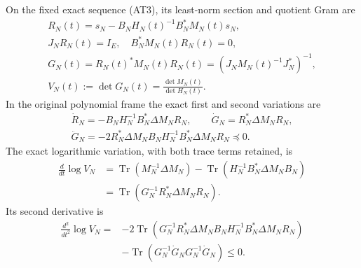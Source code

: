 \documentclass{article}
\newcommand{\Tr}{\operatorname{Tr}}
\begin{document}
\begin{theorem}
On the fixed exact sequence (AT3), its least-norm section and quotient
Gram are
\[
 \begin{gathered}
 R_N(t)=s_N-B_NH_N(t)^{-1}B_N^*M_N(t)s_N,\\
 J_NR_N(t)=I_E,\quad B_N^*M_N(t)R_N(t)=0,\\
 G_N(t)=R_N(t)^*M_N(t)R_N(t)
       =(J_NM_N(t)^{-1}J_N^*)^{-1},\\
 V_N(t):=\det G_N(t)=\frac{\det M_N(t)}{\det H_N(t)}.
                                                        \end{gathered}
 \tag{AT6}
\]
In the original polynomial frame the exact first and second variations
are
\[
 \begin{gathered}
 \dot R_N=-B_NH_N^{-1}B_N^*\Delta M_NR_N,\qquad
 \dot G_N=R_N^*\Delta M_NR_N,\\
 \ddot G_N=-2R_N^*\Delta M_NB_NH_N^{-1}B_N^*\Delta M_NR_N
            \preceq0.                                \end{gathered}
 \tag{AT7}
\]
The exact logarithmic variation, with both trace terms retained, is
\[
 \begin{split}
 \frac{d}{dt}\log V_N
 &=\Tr(M_N^{-1}\Delta M_N)
   -\Tr(H_N^{-1}B_N^*\Delta M_NB_N)\\
 &=\Tr(G_N^{-1}R_N^*\Delta M_NR_N).             \end{split}
 \tag{AT8}
\]
Its second derivative is
\[
 \begin{split}
 \frac{d^2}{dt^2}\log V_N
 ={}&-2\Tr(G_N^{-1}R_N^*\Delta M_NB_NH_N^{-1}
                         B_N^*\Delta M_NR_N)\\
    &-\Tr(G_N^{-1}\dot G_NG_N^{-1}\dot G_N)\le0.
                                                        \end{split}
 \tag{AT9}
\]
\end{theorem}
\end{document}
